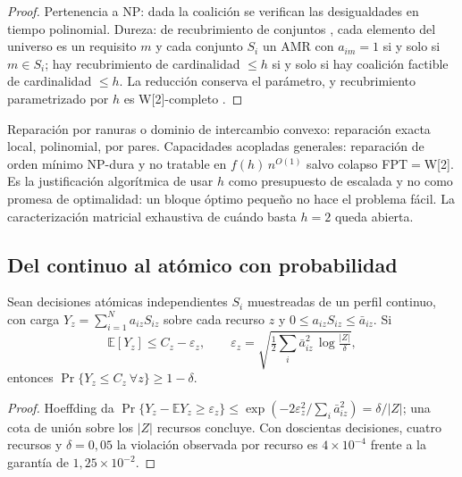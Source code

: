 \begin{proof}
Pertenencia a NP: dada la coalición se verifican las desigualdades en tiempo
polinomial. Dureza: de recubrimiento de conjuntos \cite{karp1972reducibility},
cada elemento del universo es un requisito $m$ y cada conjunto $S_i$ un AMR
con $a_{im}=1$ si y solo si $m\in S_i$; hay recubrimiento de cardinalidad
$\le h$ si y solo si hay coalición factible de cardinalidad $\le h$. La
reducción conserva el parámetro, y recubrimiento parametrizado por $h$ es
W[2]-completo \cite{downey2013fundamentals}.
\end{proof}

\begin{observacion}
\label{obs:dicotomia}
Reparación por ranuras o dominio de intercambio convexo: reparación exacta
local, polinomial, por pares. Capacidades acopladas generales: reparación de
orden mínimo NP-dura y no tratable en $f(h)\,n^{O(1)}$ salvo colapso
FPT$=$W[2]. Es la justificación algorítmica de usar $h$ como presupuesto de
escalada y no como promesa de optimalidad: un bloque óptimo pequeño no hace el
problema fácil. La caracterización matricial exhaustiva de cuándo basta $h=2$
queda abierta.
\end{observacion}

\subsection{Del continuo al atómico con probabilidad}

\begin{proposicion}
\label{pr:hoeffding}
Sean decisiones atómicas independientes $S_i$ muestreadas de un perfil
continuo, con carga $Y_z=\sum_{i=1}^{N}a_{iz}S_{iz}$ sobre cada recurso $z$ y
$0\le a_{iz}S_{iz}\le\bar a_{iz}$. Si
\begin{equation}
  \label{eq:hoeffding}
  \mathbb E[Y_z]\le C_z-\varepsilon_z,\qquad
  \varepsilon_z=\sqrt{\tfrac12\sum_i\bar a_{iz}^2\,\log\tfrac{|Z|}{\delta}},
\end{equation}
entonces $\Pr\{Y_z\le C_z\ \forall z\}\ge1-\delta$.
\end{proposicion}

\begin{proof}
Hoeffding da $\Pr\{Y_z-\mathbb EY_z\ge\varepsilon_z\}\le\exp(-2\varepsilon_z^2/\sum_i\bar a_{iz}^2)=\delta/|Z|$;
una cota de unión sobre los $|Z|$ recursos concluye. Con doscientas
decisiones, cuatro recursos y $\delta=0{,}05$ la violación observada por
recurso es $4\times10^{-4}$ frente a la garantía de $1{,}25\times10^{-2}$.
\end{proof}


